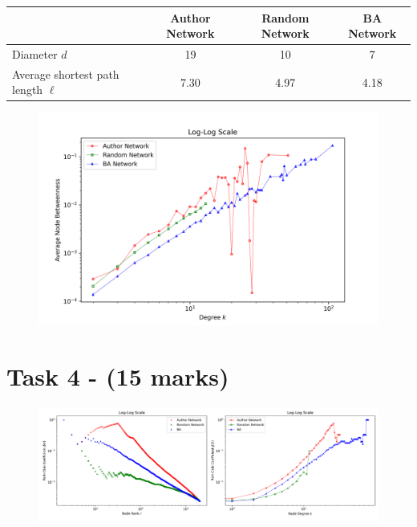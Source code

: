 \documentclass[11pt]{article}
\begin{document}
\begin{table}[h]
\centering
\begin{tabular}{lccc}
\toprule
 & \textbf{Author Network} & \textbf{Random Network} & \textbf{BA Network} \\
\midrule
Diameter $d$ & 19 & 10 & 7 \\
Average shortest path length $\ell$ & 7.30 & 4.97 & 4.18 \\
\bottomrule
\end{tabular}
\end{table}

\begin{figure}[h]
    \centering
    \includegraphics[width=1\textwidth]{average_node_betweenness.png}
    \label{fig:Averade Node Betweenness}
\end{figure}

\section*{Task 4 - (15 marks)}

\begin{figure}[h]
    \centering
    \includegraphics[width=1\textwidth]{rich_club.png}
    \label{fig:Rich-Club Coefficient}
\end{figure}
\end{document}
